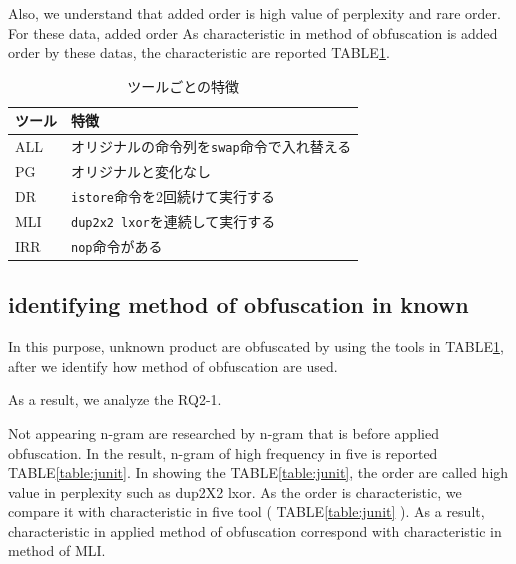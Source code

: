 \documentclass[conference]{IEEEtran}
\begin{document}
Also, we understand that added order is high value of perplexity and rare order.
For these data, added order
As characteristic in method of obfuscation is added order by these datas, the characteristic are reported TABLE\ref{table:features}.



\begin{table}[t]
  \centering
  \footnotesize{
    \caption{ツールごとの特徴}\label{table:features}
  \begin{tabular}{l|l}
    ツール              & 特徴　\\ \hline
    ALL & オリジナルの命令列を\texttt{swap}命令で入れ替える \\
    PG  & オリジナルと変化なし \\
    DR  & \texttt{istore}命令を2回続けて実行する \\
    MLI & \texttt{dup2x2 lxor}を連続して実行する \\
    IRR & \texttt{nop}命令がある \\
  \end{tabular}}
\end{table}


\subsection{identifying method of obfuscation in known}
In this purpose, unknown product are obfuscated by using the tools in TABLE\ref{table:features}, after we identify how method of obfuscation are used.

As a result, we analyze the RQ2-1.

Not appearing n-gram are researched by n-gram that is before applied obfuscation.
In the result, n-gram of high frequency in five is reported TABLE\ref{table:junit}.
In showing the TABLE\ref{table:junit}, the order are called high value in perplexity such as dup2X2 lxor.
As the order is characteristic, we compare it with characteristic in five tool ( TABLE\ref{table:junit} ).
As a result, characteristic in applied method of obfuscation correspond with characteristic in method of MLI.
\end{document}
